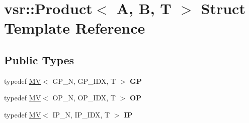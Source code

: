 \hypertarget{structvsr_1_1_product}{\section{vsr\-:\-:Product$<$ A, B, T $>$ Struct Template Reference}
\label{structvsr_1_1_product}
}
\subsection*{Public Types}
\begin{DoxyCompactItemize}
\item 
\hypertarget{structvsr_1_1_product_a93ebe04a0e4179692129bd075d156fbb}{typedef \hyperlink{classvsr_1_1_m_v}{M\-V}$<$ G\-P\-\_\-\-N, G\-P\-\_\-\-I\-D\-X, T $>$ {\bfseries G\-P}}\label{structvsr_1_1_product_a93ebe04a0e4179692129bd075d156fbb}

\item 
\hypertarget{structvsr_1_1_product_ad9bf15ed22bc9441d59585e7ca568c7f}{typedef \hyperlink{classvsr_1_1_m_v}{M\-V}$<$ O\-P\-\_\-\-N, O\-P\-\_\-\-I\-D\-X, T $>$ {\bfseries O\-P}}\label{structvsr_1_1_product_ad9bf15ed22bc9441d59585e7ca568c7f}

\item 
\hypertarget{structvsr_1_1_product_a6bacea9822efb83ad1721b9cb76c33bf}{typedef \hyperlink{classvsr_1_1_m_v}{M\-V}$<$ I\-P\-\_\-\-N, I\-P\-\_\-\-I\-D\-X, T $>$ {\bfseries I\-P}}\label{structvsr_1_1_product_a6bacea9822efb83ad1721b9cb76c33bf}

\end{DoxyCompactItemize}
